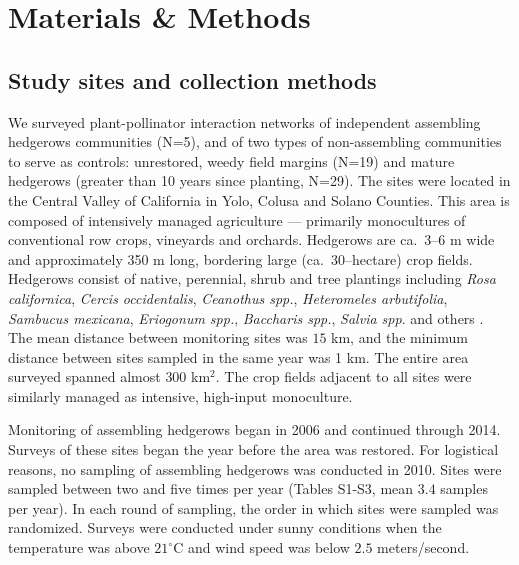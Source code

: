 \documentclass[12pt]{article}
\begin{document}

\section*{Materials \& Methods}
\label{sec:methods}

\subsection*{Study sites and collection methods}
\label{sec:study-sites}

We surveyed plant-pollinator interaction networks of independent
assembling hedgerows communities (N=5), and of two types of
non-assembling communities to serve as controls: unrestored, weedy
field margins (N=19) and mature hedgerows (greater than 10 years since
planting, N=29). The sites were located in the Central Valley of
California in Yolo, Colusa and Solano Counties. This area is composed
of intensively managed agriculture --- primarily monocultures of
conventional row crops, vineyards and orchards. Hedgerows are ca.~3--6
m wide and approximately 350 m long, bordering large (ca.\
30--hectare) crop fields. Hedgerows consist of native, perennial,
shrub and tree plantings including \textit{Rosa californica},
\textit{Cercis occidentalis}, \textit{Ceanothus spp.},
\textit{Heteromeles arbutifolia}, \textit{Sambucus mexicana},
\textit{Eriogonum spp.}, \textit{Baccharis spp.}, \textit{Salvia
  spp}. and others \citep[Fig.~S1][]{menz-2010-4, kremen-2015-602,
  mgonigle-2015-x}. The mean distance between monitoring sites was
$15$ km, and the minimum distance between sites sampled in the same
year was 1 km.  The entire area surveyed spanned almost $300$
km$^2$. The crop fields adjacent to all sites were similarly managed
as intensive, high-input monoculture.

Monitoring of assembling hedgerows began in 2006 and continued through
2014. Surveys of these sites began the year before the area was
restored. For logistical reasons, no sampling of assembling hedgerows
was conducted in 2010. Sites were sampled between two and five times
per year (Tables S1-S3, mean $3.4$ samples per year). In each round of
sampling, the order in which sites were sampled was
randomized. Surveys were conducted under sunny conditions when the
temperature was above $21^{\circ}\mathrm{C}$ and wind speed was below
$2.5$ meters/second.
\end{document}
